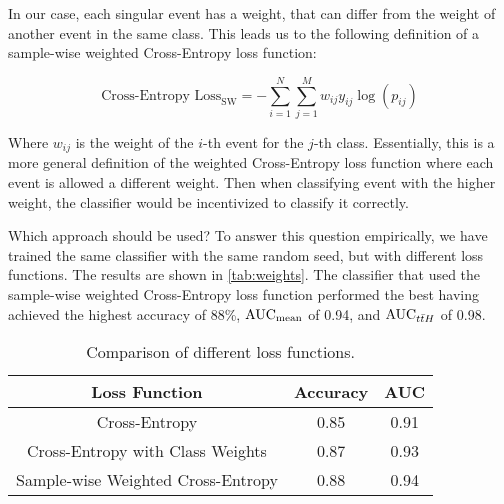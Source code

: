 In our case, each singular event has a weight, that can differ from the weight of another event in the same class. This
leads us to the following definition of a sample-wise weighted Cross-Entropy loss function:

$$
    \text{Cross-Entropy Loss}_\text{SW} = -\sum_{i=1}^{N} \sum_{j=1}^{M} w_{ij} y_{ij} \log(p_{ij})
$$

Where $w_{ij}$ is the weight of the $i$-th event for the $j$-th class. Essentially, this is a more general definition of
the weighted Cross-Entropy loss function where each event is allowed a different weight. Then when classifying event
with the higher weight, the classifier would be incentivized to classify it correctly.

Which approach should be used? To answer this question empirically, we have trained the same classifier with the same
random seed, but with different loss functions. The results are shown in \autoref{tab:weights}. The classifier
that used the sample-wise weighted Cross-Entropy loss function performed the best having achieved the highest accuracy
of 88\%, $\text{AUC}_\text{mean}$ of 0.94, and $\text{AUC}_{t\bar{t}H}$ of 0.98.

\begin{table}[htbp]
    \centering
    \begin{tabular}{ccc}
        \toprule
        Loss Function                      & Accuracy & AUC  \\
        \midrule
        Cross-Entropy                      & 0.85     & 0.91 \\
        Cross-Entropy with Class Weights   & 0.87     & 0.93 \\
        Sample-wise Weighted Cross-Entropy & 0.88     & 0.94 \\
        \bottomrule
    \end{tabular}
    \caption{Comparison of different loss functions.}
    \label{tab:weights}
\end{table}

